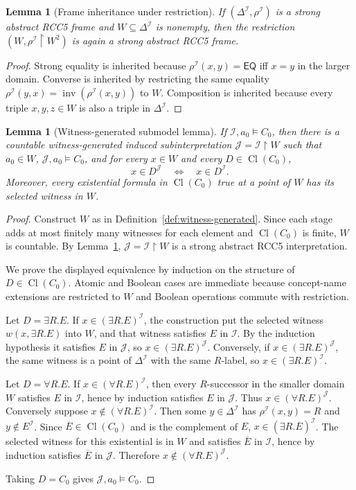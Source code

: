 \documentclass[11pt]{article}
\newtheorem{lemma}[theorem]{Lemma}
\newcommand{\EQ}{\mathsf{EQ}}
\newcommand{\Inv}{\operatorname{inv}}
\newcommand{\Cl}{\operatorname{Cl}}
\newcommand{\I}{\mathcal I}
\newcommand{\J}{\mathcal J}
\begin{document}
\begin{lemma}[Frame inheritance under restriction]\label{lem:restriction-frame}
If $(\Delta^\I,\rho^\I)$ is a strong abstract RCC5 frame and $W\subseteq\Delta^\I$ is nonempty, then the restriction $(W,\rho^\I\upharpoonright W^2)$ is again a strong abstract RCC5 frame.
\end{lemma}

\begin{proof}
Strong equality is inherited because $\rho^\I(x,y)=\EQ$ iff $x=y$ in the larger domain.  Converse is inherited by restricting the same equality $\rho^\I(y,x)=\Inv(\rho^\I(x,y))$ to $W$.  Composition is inherited because every triple $x,y,z\in W$ is also a triple in $\Delta^\I$.
\end{proof}

\begin{lemma}[Witness-generated submodel lemma]\label{lem:thinning}
If $\I,a_0\models C_0$, then there is a countable witness-generated induced subinterpretation $\J=\I\upharpoonright W$ such that $a_0\in W$, $\J,a_0\models C_0$, and for every $x\in W$ and every $D\in\Cl(C_0)$,
\[
   x\in D^\J \quad\Longleftrightarrow\quad x\in D^\I.
\]
Moreover, every existential formula in $\Cl(C_0)$ true at a point of $W$ has its selected witness in $W$.
\end{lemma}

\begin{proof}
Construct $W$ as in Definition~\ref{def:witness-generated}.  Since each stage adds at most finitely many witnesses for each element and $\Cl(C_0)$ is finite, $W$ is countable.  By Lemma~\ref{lem:restriction-frame}, $\J=\I\upharpoonright W$ is a strong abstract RCC5 interpretation.

We prove the displayed equivalence by induction on the structure of $D\in\Cl(C_0)$.  Atomic and Boolean cases are immediate because concept-name extensions are restricted to $W$ and Boolean operations commute with restriction.

Let $D=\exists R.E$.  If $x\in(\exists R.E)^\I$, the construction put the selected witness $w(x,\exists R.E)$ into $W$, and that witness satisfies $E$ in $\I$.  By the induction hypothesis it satisfies $E$ in $\J$, so $x\in(\exists R.E)^\J$.  Conversely, if $x\in(\exists R.E)^\J$, the same witness is a point of $\Delta^\I$ with the same $R$-label, so $x\in(\exists R.E)^\I$.

Let $D=\forall R.E$.  If $x\in(\forall R.E)^\I$, then every $R$-successor in the smaller domain $W$ satisfies $E$ in $\I$, hence by induction satisfies $E$ in $\J$.  Thus $x\in(\forall R.E)^\J$.  Conversely suppose $x\notin(\forall R.E)^\I$.  Then some $y\in\Delta^\I$ has $\rho^\I(x,y)=R$ and $y\notin E^\I$.  Since $\overline E\in\Cl(C_0)$ and is the complement of $E$, $x\in(\exists R.\overline E)^\I$.  The selected witness for this existential is in $W$ and satisfies $\overline E$ in $\I$, hence by induction satisfies $\overline E$ in $\J$.  Therefore $x\notin(\forall R.E)^\J$.

Taking $D=C_0$ gives $\J,a_0\models C_0$.
\end{proof}
\end{document}
